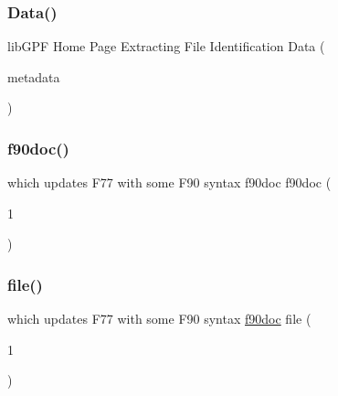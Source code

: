 \subsubsection{\texorpdfstring{Data()}{Data()}}
{\footnotesize\ttfamily lib\+G\+PF Home Page Extracting File Identification Data (\begin{DoxyParamCaption}\item[{metadata}]{ }\end{DoxyParamCaption})}

\mbox{\label{what__overview_81_8txt_aab2f56fdcdfab484c0d861985675a92f}} 
\subsubsection{\texorpdfstring{f90doc()}{f90doc()}}
{\footnotesize\ttfamily which updates F77 with some F90 syntax f90doc f90doc (\begin{DoxyParamCaption}\item[{1}]{ }\end{DoxyParamCaption})}

\mbox{\label{what__overview_81_8txt_a447b56c526e8da30e0dc94673727ee25}} 
\subsubsection{\texorpdfstring{file()}{file()}}
{\footnotesize\ttfamily which updates F77 with some F90 syntax \hyperlink{what__overview_81_8txt_aab2f56fdcdfab484c0d861985675a92f}{f90doc} file (\begin{DoxyParamCaption}\item[{1}]{ }\end{DoxyParamCaption})}

